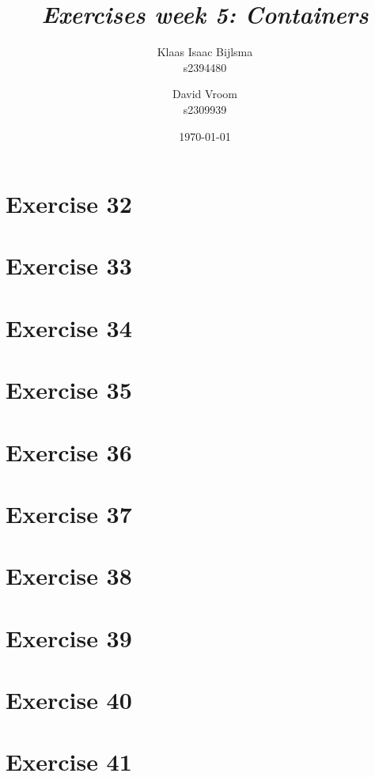 \documentclass[12pt]{article}
\title{\itshape Exercises week 5: Containers}
\author{
	Klaas Isaac Bijlsma \\ s2394480
	\and
	David Vroom \\ s2309939
}
\date{\today}
\newcommand{\desc}[1]{\textit{#1} \vspace{1em}}
\begin{document}
\maketitle

\section*{Exercise 32}
\desc{}

\clearpage

\section*{Exercise 33}
\desc{}

\clearpage

\section*{Exercise 34}
\desc{}

\clearpage

\section*{Exercise 35}
\desc{}

\clearpage

\section*{Exercise 36}
\desc{}

\clearpage

\section*{Exercise 37}
\desc{}

\clearpage

\section*{Exercise 38}
\desc{}

\clearpage

\section*{Exercise 39}
\desc{}

\clearpage

\section*{Exercise 40}
\desc{}

\clearpage

\section*{Exercise 41}
\desc{}

\clearpage
\end{document}

